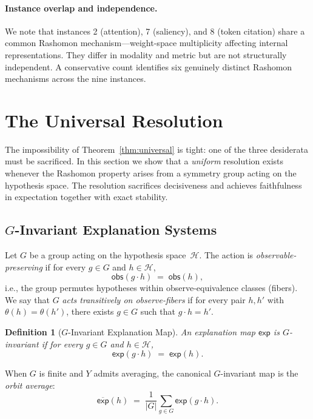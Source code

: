 \documentclass[11pt,a4paper]{article}
\newtheorem{definition}[theorem]{Definition}
\newcommand{\sH}{\mathcal{H}}
\begin{document}
\paragraph{Instance overlap and independence.}
We note that instances 2 (attention), 7 (saliency), and 8 (token citation)
share a common Rashomon mechanism---weight-space multiplicity affecting
internal representations.  They differ in modality and metric but are not
structurally independent.  A conservative count identifies six genuinely
distinct Rashomon mechanisms across the nine instances.

\section{The Universal Resolution}
\label{sec:resolution}

The impossibility of Theorem~\ref{thm:universal} is tight: one of the three
desiderata must be sacrificed.  In this section we show that a \emph{uniform}
resolution exists whenever the Rashomon property arises from a symmetry group
acting on the hypothesis space.  The resolution sacrifices decisiveness and
achieves faithfulness in expectation together with exact stability.

\subsection[G-Invariant Explanation Systems]{$G$-Invariant Explanation Systems}
\label{sec:g-invariant}

Let $G$ be a group acting on the hypothesis space~$\sH$.  The action is
\emph{observable-preserving} if for every $g \in G$ and $h \in \sH$,
\[
  \mathsf{obs}(g \cdot h) \;=\; \mathsf{obs}(h),
\]
i.e., the group permutes hypotheses within observe-equivalence classes
(fibers).  We say that $G$ \emph{acts transitively on observe-fibers} if for
every pair $h, h'$ with $\theta(h) = \theta(h')$, there exists $g \in G$
such that $g \cdot h = h'$.

\begin{definition}[$G$-Invariant Explanation Map]
\label{def:g-invariant}
An explanation map $\mathsf{exp}$ is \emph{$G$-invariant} if for every
$g \in G$ and $h \in \sH$,
\[
  \mathsf{exp}(g \cdot h) \;=\; \mathsf{exp}(h).
\]
\end{definition}

When $G$ is finite and $Y$ admits averaging, the canonical $G$-invariant map
is the \emph{orbit average}:
\[
  \overline{\mathsf{exp}}(h) \;=\; \frac{1}{|G|}\sum_{g \in G} \mathsf{exp}(g \cdot h).
\]
\end{document}
